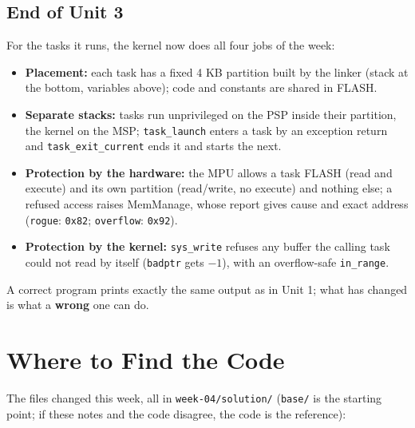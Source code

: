 \subsection{End of Unit 3}

For the tasks it runs, the kernel now does all four jobs of the week:

\begin{itemize}
    \item \textbf{Placement:} each task has a fixed 4 KB partition built by the linker (stack at the bottom, variables above); code and constants are shared in FLASH.
    \item \textbf{Separate stacks:} tasks run unprivileged on the PSP inside their partition, the kernel on the MSP; \texttt{task\_launch} enters a task by an exception return and \texttt{task\_exit\_current} ends it and starts the next.
    \item \textbf{Protection by the hardware:} the MPU allows a task FLASH (read and execute) and its own partition (read/write, no execute) and nothing else; a refused access raises MemManage, whose report gives cause and exact address (\texttt{rogue}: \texttt{0x82}; \texttt{overflow}: \texttt{0x92}).
    \item \textbf{Protection by the kernel:} \texttt{sys\_write} refuses any buffer the calling task could not read by itself (\texttt{badptr} gets $-1$), with an overflow-safe \texttt{in\_range}.
\end{itemize}

A correct program prints exactly the same output as in Unit 1; what has changed is what a \textbf{wrong} one can do.

\section{Where to Find the Code}

The files changed this week, all in \texttt{week-04/solution/} (\texttt{base/} is the starting point; if these notes and the code disagree, the code is the reference):

